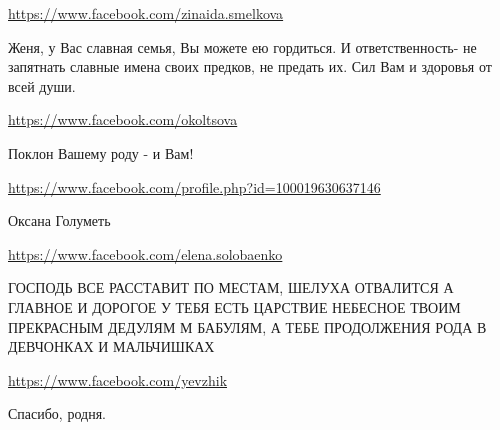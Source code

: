 \documentclass[a4paper,11pt]{extreport}
\begin{document}
\begin{itemize}
\url{https://www.facebook.com/zinaida.smelkova}

Женя, у Вас славная семья, Вы можете ею гордиться. И ответственность- не запятнать славные имена своих предков, не предать их. Сил Вам и здоровья от всей души.

\url{https://www.facebook.com/okoltsova}

Поклон Вашему роду - и Вам!

\url{https://www.facebook.com/profile.php?id=100019630637146}

Оксана Голуметь

\url{https://www.facebook.com/elena.solobaenko}

ГОСПОДЬ ВСЕ РАССТАВИТ ПО МЕСТАМ, ШЕЛУХА ОТВАЛИТСЯ А ГЛАВНОЕ И ДОРОГОЕ У ТЕБЯ ЕСТЬ ЦАРСТВИЕ НЕБЕСНОЕ ТВОИМ ПРЕКРАСНЫМ ДЕДУЛЯМ М БАБУЛЯМ, А ТЕБЕ ПРОДОЛЖЕНИЯ РОДА В ДЕВЧОНКАХ И МАЛЬЧИШКАХ

\url{https://www.facebook.com/yevzhik}

Спасибо, родня.

\end{itemize}
\end{document}
